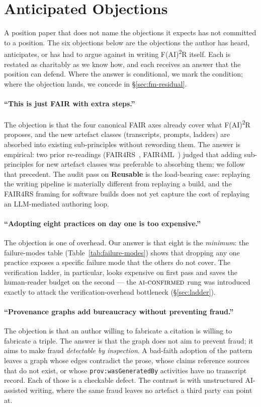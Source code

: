 \section{Anticipated Objections}
\label{sec:objections}

A position paper that does not name the objections it expects has
not committed to a position. The six objections below are the
objections the author has heard, anticipates, or has had to argue
against in writing F(AI)\textsuperscript{2}R itself. Each is
restated as charitably as we know how, and each receives an answer
that the position can defend. Where the answer is conditional, we
mark the condition; where the objection lands, we concede in
\S\ref{sec:fm-residual}.

\paragraph{``This is just FAIR with extra steps.''}
The objection is that the four canonical FAIR axes already cover
what F(AI)\textsuperscript{2}R proposes, and the new artefact
classes (transcripts, prompts, ladders) are absorbed into existing
sub-principles without rewording them. The answer is empirical:
two prior re-readings (FAIR4RS~\cite{chuehong2022fair4rs},
FAIR4ML~\cite{ravi2024fair4ml}) judged that adding sub-principles
for new artefact classes was preferable to absorbing them; we
follow that precedent. The audit pass on \textbf{Reusable} is the
load-bearing case: replaying the writing pipeline is materially
different from replaying a build, and the FAIR4RS framing for
software builds does not yet capture the cost of replaying an
LLM-mediated authoring loop.

\paragraph{``Adopting eight practices on day one is too expensive.''}
The objection is one of overhead. Our answer is that eight is the
\emph{minimum}: the failure-modes table (Table~\ref{tab:failure-modes})
shows that dropping any one practice exposes a specific failure
mode that the others do not cover. The verification ladder, in
particular, looks expensive on first pass and saves the
human-reader budget on the second --- the $\textsc{ai-confirmed}$
rung was introduced exactly to attack the verification-overhead
bottleneck (\S\ref{sec:ladder}).

\paragraph{``Provenance graphs add bureaucracy without preventing
fraud.''}
The objection is that an author willing to fabricate a citation is
willing to fabricate a triple. The answer is that the graph does
not aim to prevent fraud; it aims to make fraud
\emph{detectable by inspection}. A bad-faith adoption of the pattern
leaves a graph whose edges contradict the prose, whose claims
reference sources that do not exist, or whose
\texttt{prov:wasGeneratedBy} activities have no transcript record.
Each of those is a checkable defect. The contrast is with
unstructured AI-assisted writing, where the same fraud leaves no
artefact a third party can point at.

